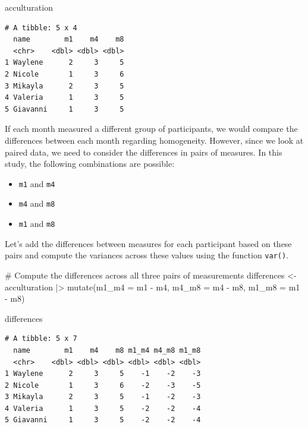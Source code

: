 \documentclass[
  letterpaper,
  DIV=11,
  numbers=noendperiod]{scrreprt}
\newenvironment{Shaded}{\begin{snugshade}}{\end{snugshade}}
\newcommand{\AttributeTok}[1]{\textcolor[rgb]{0.40,0.45,0.13}{#1}}
\newcommand{\CommentTok}[1]{\textcolor[rgb]{0.37,0.37,0.37}{#1}}
\newcommand{\FunctionTok}[1]{\textcolor[rgb]{0.28,0.35,0.67}{#1}}
\newcommand{\NormalTok}[1]{\textcolor[rgb]{0.00,0.23,0.31}{#1}}
\newcommand{\OtherTok}[1]{\textcolor[rgb]{0.00,0.23,0.31}{#1}}
\newcommand{\SpecialCharTok}[1]{\textcolor[rgb]{0.37,0.37,0.37}{#1}}
\begin{document}
\begin{Shaded}
\begin{Highlighting}[]
\NormalTok{acculturation}
\end{Highlighting}
\end{Shaded}

\begin{verbatim}
# A tibble: 5 x 4
  name        m1    m4    m8
  <chr>    <dbl> <dbl> <dbl>
1 Waylene      2     3     5
2 Nicole       1     3     6
3 Mikayla      2     3     5
4 Valeria      1     3     5
5 Giavanni     1     3     5
\end{verbatim}

If each month measured a different group of participants, we would
compare the differences between each month regarding homogeneity.
However, since we look at paired data, we need to consider the
differences in pairs of measures. In this study, the following
combinations are possible:

\begin{itemize}
\item
  \texttt{m1} and \texttt{m4}
\item
  \texttt{m4} and \texttt{m8}
\item
  \texttt{m1} and \texttt{m8}
\end{itemize}

Let's add the differences between measures for each participant based on
these pairs and compute the variances across these values using the
function \texttt{var()}.

\begin{Shaded}
\begin{Highlighting}[]
\CommentTok{\# Compute the differences across all three pairs of measurements}
\NormalTok{differences }\OtherTok{\textless{}{-}}
\NormalTok{  acculturation }\SpecialCharTok{|\textgreater{}}
  \FunctionTok{mutate}\NormalTok{(}\AttributeTok{m1\_m4 =}\NormalTok{ m1 }\SpecialCharTok{{-}}\NormalTok{ m4,}
         \AttributeTok{m4\_m8 =}\NormalTok{ m4 }\SpecialCharTok{{-}}\NormalTok{ m8,}
         \AttributeTok{m1\_m8 =}\NormalTok{ m1 }\SpecialCharTok{{-}}\NormalTok{ m8)}

\NormalTok{differences}
\end{Highlighting}
\end{Shaded}

\begin{verbatim}
# A tibble: 5 x 7
  name        m1    m4    m8 m1_m4 m4_m8 m1_m8
  <chr>    <dbl> <dbl> <dbl> <dbl> <dbl> <dbl>
1 Waylene      2     3     5    -1    -2    -3
2 Nicole       1     3     6    -2    -3    -5
3 Mikayla      2     3     5    -1    -2    -3
4 Valeria      1     3     5    -2    -2    -4
5 Giavanni     1     3     5    -2    -2    -4
\end{verbatim}
\end{document}
